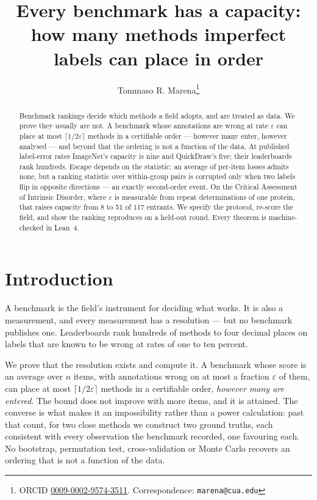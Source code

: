 \documentclass[11pt,a4paper]{article}
\title{\bfseries Every benchmark has a capacity: how many methods
imperfect labels can place in order}
\author[1]{Tommaso R. Marena\thanks{ORCID
\href{https://orcid.org/0009-0002-9574-3511}{0009-0002-9574-3511}.
Correspondence: \texttt{marena@cua.edu}}}
\affil[1]{The Catholic University of America, Washington, DC, USA}
\date{}
\newcommand{\eps}{\varepsilon}
\begin{document}
\maketitle

\begin{abstract}
\noindent
Benchmark rankings decide which methods a field adopts, and are treated as data.
We prove they usually are not. A benchmark whose annotations are wrong
at rate $\eps$ can place at most $\lceil 1/2\eps \rceil$ methods in a certifiable
order --- however many enter, however analysed --- and beyond that the ordering is not a
function of the data. At published label-error rates ImageNet's capacity is nine and
QuickDraw's five; their leaderboards rank hundreds. Escape depends on the statistic: an average of per-item losses admits none, but
a ranking statistic over within-group pairs is corrupted only when two labels
flip in opposite directions --- an exactly second-order event. On the Critical Assessment of Intrinsic Disorder, where
$\eps$ is measurable from repeat determinations of one protein, that raises
capacity from 8 to 51 of 117 entrants. We specify the protocol, re-score the field, and show the ranking reproduces on
a held-out round. Every theorem is machine-checked in Lean~4.
\end{abstract}

\vspace{1em}

\section*{Introduction}

A benchmark is the field's instrument for deciding what works. It is also a
measurement, and every measurement has a resolution --- but no benchmark
publishes one. Leaderboards rank hundreds of methods to four decimal places on
labels that are known to be wrong at rates of one to ten percent.

We prove that the resolution exists and compute it. A benchmark whose score is
an average over $n$ items, with annotations wrong on at most a fraction $\eps$
of them, can place at most $\lceil 1/2\eps \rceil$ methods in a certifiable
order, \emph{however many are entered}. The bound does not improve with more
items, and it is attained. The converse is what makes it an impossibility rather
than a power calculation: past that count, for two close methods we construct
two ground truths, each consistent with every observation the benchmark
recorded, one favouring each. No bootstrap, permutation test, cross-validation
or Monte Carlo recovers an ordering that is not a function of the data.
\end{document}
